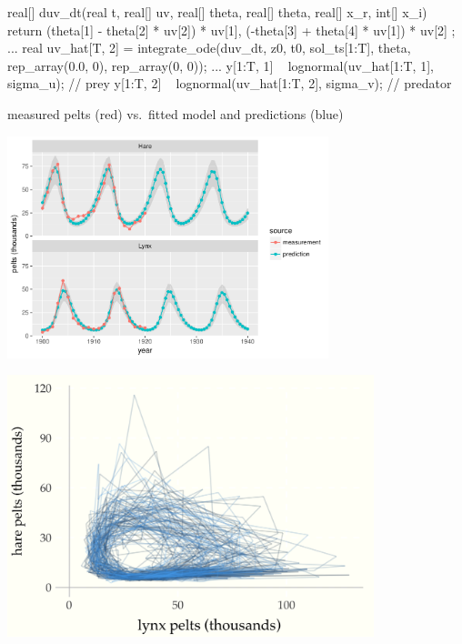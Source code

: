 \documentclass[9pt]{report}
\begin{document}
\begin{stancode}
real[] duv_dt(real t, real[] uv, real[] theta,
              real[] theta, real[] x_r, int[] x_i) {
  return { (theta[1] - theta[2] * uv[2]) * uv[1],
           (-theta[3] + theta[4] * uv[1]) * uv[2] };
}
...
real uv_hat[T, 2]
  = integrate_ode(duv_dt, z0, t0, sol_ts[1:T], theta,
                  rep_array(0.0, 0), rep_array(0, 0));
...
y[1:T, 1] ~ lognormal(uv_hat[1:T, 1], sigma_u);  // prey
y[1:T, 2] ~ lognormal(uv_hat[1:T, 2], sigma_v);  // predator
\end{stancode}

\begin{subitemize}
\item measured pelts (red) vs.\ fitted model and predictions (blue)
\end{subitemize}
\begin{center}
\includegraphics[width=0.7\textwidth]{img/lotka-volterra-posterior.pdf}
\end{center}

\begin{center}
\includegraphics[width=0.8\textwidth]{img/lotka-volterra-posterior-time.png}
\end{center}
\end{document}
